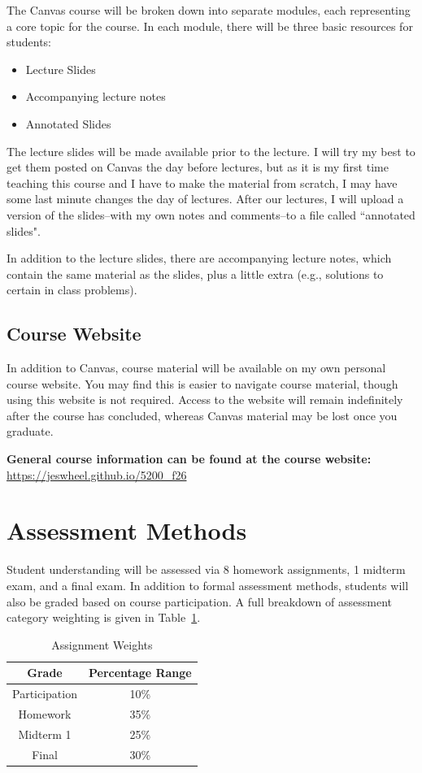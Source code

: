 \documentclass[11pt]{article}\usepackage[]{graphicx}\usepackage[]{xcolor}
\begin{document}
The Canvas course will be broken down into separate modules, each representing a core topic for the course.
In each module, there will be three basic resources for students: 
\begin{itemize}
  \item Lecture Slides
  \item Accompanying lecture notes
  \item Annotated Slides
\end{itemize}
The lecture slides will be made available prior to the lecture.
I will try my best to get them posted on Canvas the day before lectures, but as it is my first time teaching this course and I have to make the material from scratch, I may have some last minute changes the day of lectures.
After our lectures, I will upload a version of the slides--with my own notes and comments--to a file called ``annotated slides". 

In addition to the lecture slides, there are accompanying lecture notes, which contain the same material as the slides, plus a little extra (e.g., solutions to certain in class problems).

\subsection{Course Website}

In addition to Canvas, course material will be available on my own personal course website.
You may find this is easier to navigate course material, though using this website is not required.
Access to the website will remain indefinitely after the course has concluded, whereas Canvas material may be lost once you graduate.

\textbf{General course information can be found at the course website:} \url{https://jeswheel.github.io/5200\_f26}

\section{Assessment Methods}

Student understanding will be assessed via 8 homework assignments, 1 midterm exam, and a final exam.
In addition to formal assessment methods, students will also be graded based on course participation.
A full breakdown of assessment category weighting is given in Table~\ref{tab:weights}.

\begin{table}[h!]
\centering
\begin{tabular}{|c|c|}
\hline
\textbf{Grade} & \textbf{Percentage Range} \\
\hline
Participation & 10\% \\
Homework & 35\% \\
Midterm 1 & 25\% \\
Final & 30\% \\
\hline
\end{tabular}
\caption{\label{tab:weights}Assignment Weights}
\end{table}
\end{document}
